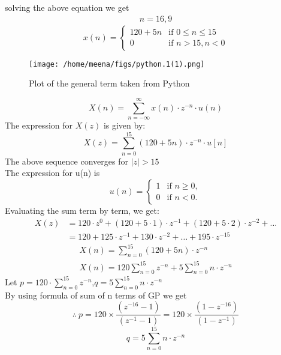 \documentclass[journal,12pt,twocolumn]{IEEEtran}
\theoremstyle{remark}
\begin{document}
solving the above equation we get
\begin{align}
   n=16,9
\end{align}
\[ x(n) = \begin{cases}
          120 + 5n & \text{if }0 \leq n\leq 15 \\
          0 & \text{if } n >15 , n<0
       \end{cases} \]
\begin{figure}[h]
  \centering
  \texttt{[image: /home/meena/figs/python.1(1).png]} 
  \captionsetup{justification=centering}
  \caption{Plot of the general term taken from Python}
  \label{fig:your_label}
\end{figure}
\begin{equation}
    X(n) = \sum_{n=-\infty}^{\infty} x(n) \cdot z^{-n}\cdot u(n)
\end{equation}
The expression for \(X(z)\) is given by:
\begin{equation}
    X(z) = \sum_{n=0}^{15} (120 + 5n) \cdot z^{-n} \cdot u[n]
\end{equation}
The above sequence  converges for \(\lvert z \rvert > 15\)\\
The expression for u(n) is 
\[ u(n) = \begin{cases}
    1 & \text{if } n \geq 0, \\
    0 & \text{if } n < 0.
\end{cases} \]
Evaluating the sum term by term, we get:
\begin{align}
X(z) &= 120 \cdot z^0 + (120 + 5 \cdot 1) \cdot z^{-1} + (120 + 5 \cdot 2) \cdot z^{-2} + \ldots  \\
&= 120 + 125 \cdot z^{-1} + 130 \cdot z^{-2} + \ldots + 195 \cdot z^{-15}
\end{align}
\begin{align}
   X(n) = \sum_{n=0}^{15} (120+5n) \cdot z^{-n}\\
   X(n) = 120\sum_{n=0}^{15}z^{-n}+5\sum_{n=0}^{15}n\cdot z^{-n}
\end{align}
Let $p = 120 \cdot \sum_{n=0}^{15} z^{-n}$,$q = 5\sum_{n=0}^{15}n\cdot z^{-n}$\\
By using formula of sum of n terms of GP we get
\begin{equation}
    \therefore\ p=120\times \frac{ ( z^{-16}-1)}{(z^{-1}-1)}=120\times \frac{ (1 - z^{-16})}{(1 - z^{-1})}
\end{equation}
\begin{equation}
   q= 5\sum_{n=0}^{15}n\cdot z^{-n}  
\end{equation}
\end{document}
